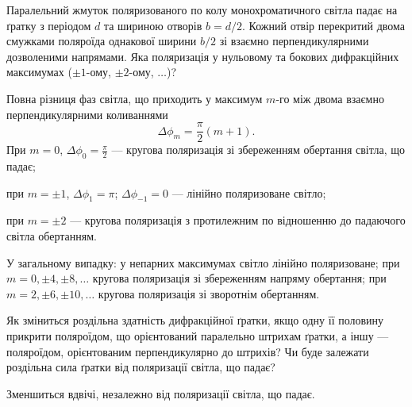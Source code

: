 \begin{problem}%
    Паралельний жмуток поляризованого по колу монохроматичного
    світла падає на ґратку з періодом $ d $ та шириною отворів $ b = {d}/2 $.
    Кожний отвір перекритий двома смужками поляроїда однакової
    ширини $ b/2 $ зі взаємно перпендикулярними дозволеними напрямами.
    Яка поляризація у нульовому та бокових дифракційних максимумах ($ \pm
    1 $-ому, $ \pm 2 $-ому, $\ldots$)?
    \begin{solution}
        Повна різниця фаз світла, що приходить у максимум $ m $-го між двома взаємно
        перпендикулярними коливаннями
        \begin{equation*}
            \Delta \phi_m = \frac{\pi}{2}(m + 1) .
        \end{equation*}
        При $ m = 0 $, $\Delta \phi_0 = \frac{\pi}{2} $ --- кругова поляризація зі збереженням обертання світла, що падає;

        при $ m = \pm1 $, $\Delta \phi_1 = \pi $; $ \Delta \phi_{-1} = 0 $ ---  лінійно поляризоване світло;

        при $  m = \pm2 $ --- кругова поляризація з протилежним по відношенню до падаючого світла обертанням.

        У загальному випадку: у непарних максимумах світло лінійно поляризоване; при $  m = 0, \pm4, \pm8, \ldots $ кругова поляризація зі збереженням напряму обертання; при $ m = 2, \pm6, \pm10, \ldots $ кругова поляризація зі зворотнім обертанням.
    \end{solution}
\end{problem}

\begin{problem}%
    Як зміниться роздільна здатність дифракційної ґратки, якщо одну її
    половину прикрити поляроїдом, що орієнтований паралельно штрихам
    ґратки, а іншу --- поляроїдом, орієнтованим перпендикулярно до
    штрихів? Чи буде залежати роздільна сила ґратки від поляризації світла,
    що падає?
    \begin{solution}
        Зменшиться вдвічі, незалежно від поляризації світла, що падає.
    \end{solution}
\end{problem}


